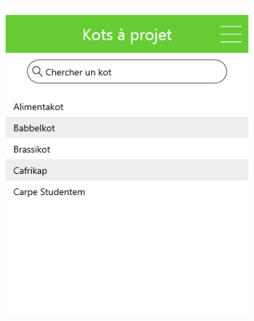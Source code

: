 \documentclass{eplmastersthesis}
\begin{document}
\begin{figure}[H]
    \centering
\begin{subfigure}[b]{0.3\textwidth}
        \includegraphics[width=\textwidth]{Images/InVision/kapliste.png}
    \end{subfigure}
    ~ %
    \begin{subfigure}[b]{0.3\textwidth}

\end{subfigure}
\end{figure}
\end{document}

